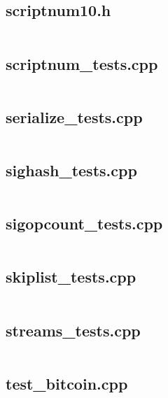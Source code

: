 \documentclass{article}
\begin{document}
\subsection{scriptnum10.h}
\inputminted{cpp}{/home/dufferzafar/dev/@clones/bitcoin/src/test/scriptnum10.h}
\newpage

\subsection{scriptnum\_tests.cpp}
\inputminted{cpp}{/home/dufferzafar/dev/@clones/bitcoin/src/test/scriptnum_tests.cpp}
\newpage

\subsection{serialize\_tests.cpp}
\inputminted{cpp}{/home/dufferzafar/dev/@clones/bitcoin/src/test/serialize_tests.cpp}
\newpage

\subsection{sighash\_tests.cpp}
\inputminted{cpp}{/home/dufferzafar/dev/@clones/bitcoin/src/test/sighash_tests.cpp}
\newpage

\subsection{sigopcount\_tests.cpp}
\inputminted{cpp}{/home/dufferzafar/dev/@clones/bitcoin/src/test/sigopcount_tests.cpp}
\newpage

\subsection{skiplist\_tests.cpp}
\inputminted{cpp}{/home/dufferzafar/dev/@clones/bitcoin/src/test/skiplist_tests.cpp}
\newpage

\subsection{streams\_tests.cpp}
\inputminted{cpp}{/home/dufferzafar/dev/@clones/bitcoin/src/test/streams_tests.cpp}
\newpage

\subsection{test\_bitcoin.cpp}
\inputminted{cpp}{/home/dufferzafar/dev/@clones/bitcoin/src/test/test_bitcoin.cpp}
\newpage
\end{document}
